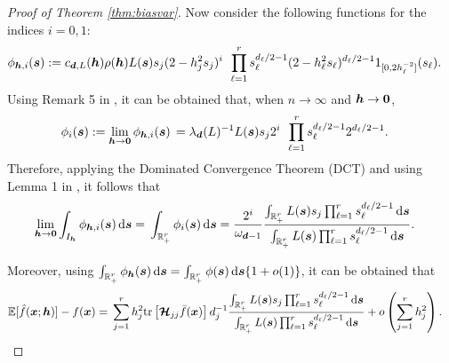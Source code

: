 \documentclass[oneside,11pt]{article}
\begin{document}
\begin{proof}[Proof of Theorem \ref{thm:biasvar}]
Now consider the following functions for the indices $i=0,1$:
\begin{align*}
    \phi_{{\boldsymbol{h}},i}(\boldsymbol{s}):=&\; c_{\boldsymbol{d},L}({\boldsymbol{h}})\rho({\boldsymbol{h}}) L(\boldsymbol{s}) s_j (2-h_j^2s_j)^i\,\;\prod_{\ell=1}^r s_\ell^{d_\ell/2-1} (2-h_\ell^2s_\ell)^{d_\ell/2-1} 1_{[0,2h^{-2}_\ell]}(s_\ell).
\end{align*}
Using Remark 5 in \cite{Garcia-Portugues2013b}, it can be obtained that, when $n\to\infty$ and ${\boldsymbol{h}}\to \mathbf{0}$,
\begin{align*}
    \phi_i(\boldsymbol{s}):=\lim_{{\boldsymbol{h}}\to \mathbf{0}}\phi_{{{\boldsymbol{h}},i}}(\boldsymbol{s})\,&=\lambda_{\boldsymbol{d}}(L)^{-1}L(\boldsymbol{s})s_j 2^i\,\;\prod_{\ell=1}^r s_\ell^{d_\ell/2-1} 2^{d_\ell/2-1}.
\end{align*}
Therefore, applying the Dominated Convergence Theorem (DCT) and using Lemma 1 in \cite{Garcia-Portugues2013b}, it follows that
\begin{align*}
    \lim_{\bh\to \zero}\int_{I_\bh}\phi_{{\bh,i}}(\bs)\,\rd \bs=&\;\int_{\R_+^r} \phi_i(\bs)\,\rd \bs%
    =
    \frac{2^{i}}{\omega_{\bd-1}}\frac{\int_{\R_+^r}L(\bs)s_j\prod_{\ell=1}^r s_\ell^{d_\ell/2-1}\,\rd \bs}{\int_{\R_+^r}L(\bs)\prod_{\ell=1}^rs_\ell^{d_\ell/2-1}\,\rd \bs}.
\end{align*}

Moreover, using $\int_{\mathbb{R}_+^r}\phi_{{{\boldsymbol{h}}}}(\boldsymbol{s})\,\mathrm{d} \boldsymbol{s}=\int_{\mathbb{R}_+^r}\phi{{}}(\boldsymbol{s})\,\mathrm{d} \boldsymbol{s}\{1+o(1)\}$, it can be obtained that
\begin{align}\label{eq:bias_res}
	\mathbb{E}[\hat{f}(\boldsymbol{x};{\boldsymbol{h}})]-f(\boldsymbol{x})=
	&\; \sum_{j=1}^rh_j^2\mathrm{tr}\left[\boldsymbol{\mathcal{H}}_{jj}\bar{f}(\boldsymbol{x})\right]d_j^{-1}\frac{\int_{\mathbb{R}_+^r}L(\boldsymbol{s})s_j\prod_{\ell=1}^r s_\ell^{d_\ell/2-1}\,\mathrm{d} \boldsymbol{s}}{\int_{\mathbb{R}_+^r}L(\boldsymbol{s})\prod_{\ell=1}^rs_\ell^{d_\ell/2-1}\,\mathrm{d} \boldsymbol{s}}+o\left(\sum_{j=1}^rh_j^2\right).
\end{align}


\end{proof}
\end{document}
